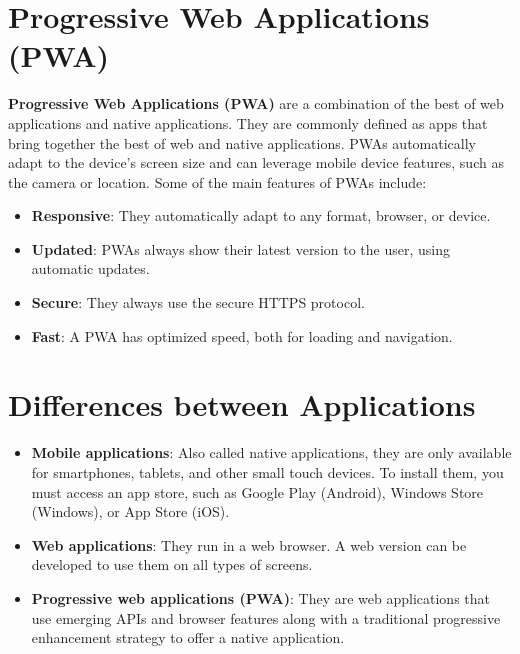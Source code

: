 \documentclass{article}
\begin{document}
	\begin{multicols}{2}
	\section{Progressive Web Applications (PWA)}
	\textbf{Progressive Web Applications (PWA)} are a combination of the best of web applications and native applications. They are commonly defined as apps that bring together the best of web and native applications. PWAs automatically adapt to the device's screen size and can leverage mobile device features, such as the camera or location. Some of the main features of PWAs include:
	
	\begin{itemize}
		\item \textbf{Responsive}: They automatically adapt to any format, browser, or device.
		\item \textbf{Updated}: PWAs always show their latest version to the user, using automatic updates.
		\item \textbf{Secure}: They always use the secure HTTPS protocol.
		\item \textbf{Fast}: A PWA has optimized speed, both for loading and navigation.
	\end{itemize}
	
	\section{Differences between Applications}
	\begin{itemize}
		\item \textbf{Mobile applications}: Also called native applications, they are only available for smartphones, tablets, and other small touch devices. To install them, you must access an app store, such as Google Play (Android), Windows Store (Windows), or App Store (iOS).
		\item \textbf{Web applications}: They run in a web browser. A web version can be developed to use them on all types of screens.
		\item \textbf{Progressive web applications (PWA)}: They are web applications that use emerging APIs and browser features along with a traditional progressive enhancement strategy to offer a native application.
	\end{itemize}
	

\end{multicols}
\end{document}
